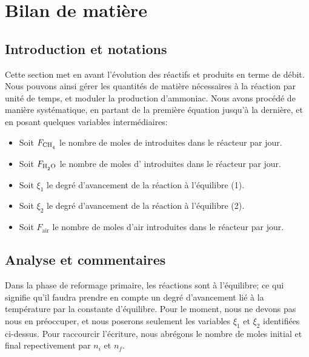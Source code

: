
\section{Bilan de matière}

\subsection{Introduction et notations}

Cette section met en avant l'évolution des réactifs et produits en terme de débit. 
Nous pouvons ainsi gérer les quantités de matière nécessaires à la réaction par unité de temps, et
moduler la production d'ammoniac. Nous avons procédé de manière systématique, en partant de la première
équation jusqu'à la dernière, et en posant quelques 
variables intermédiaires:

\begin{itemize}
	\item Soit $F_{\ce{CH4}}$ le nombre de moles de  introduites dans le réacteur par jour.
	\item Soit $F_{\ce{H2O}}$ le nombre de moles d' introduites dans le réacteur par jour.
	\item Soit $\xi_1$ le degré d'avancement de la réaction à l'équilibre (1).
	\item Soit $\xi_2$ le degré d'avancement de la réaction à l'équilibre (2).
	\item Soit $F_{\text{air}}$ le nombre de moles d'air introduites dans le réacteur par jour.
\end{itemize}

\subsection{Analyse et commentaires}
Dans la phase de reformage primaire, les réactions sont à l'équilibre; ce qui signifie qu'il faudra prendre en 
compte un degré d'avancement lié à la température par la constante d'équilibre. Pour le moment, nous ne devons pas 
nous en préoccuper, et nous poserons seulement les variables $\xi_1$ et $\xi_2$ identifiées ci-dessus. Pour raccourcir
l'écriture, nous abrégons le nombre de moles initial et final repectivement par $n_i$ et $n_f$.

